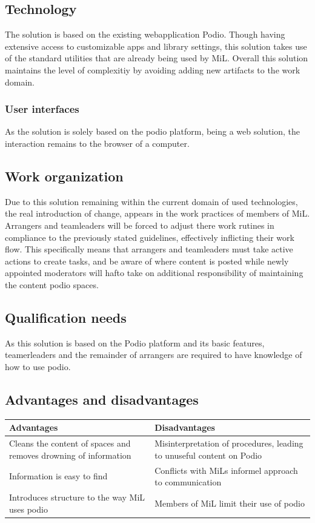 \subsection{Technology}
The solution is based on the existing webapplication Podio. Though having extensive access to customizable apps and library settings, this solution takes use of the standard utilities that are already being used by MiL. Overall this solution maintains the level of complexitiy by avoiding adding new artifacts to the work domain.

\subsubsection{User interfaces}
As the solution is solely based on the podio platform, being a web solution, the interaction remains to the browser of a computer.

\subsection{Work organization}
Due to this solution remaining within the current domain of used technologies, the real introduction of change, appears in the work practices of members of MiL. Arrangers and teamleaders will be forced to adjust there work rutines in compliance to the previously stated guidelines, effectively inflicting their work flow. 
This specifically means that arrangers and teamleaders must take active actions to create tasks, and be aware of where content is posted while newly appointed moderators will hafto take on additional responsibility of maintaining the content podio spaces.

\subsection{Qualification needs}
As this solution is based on the Podio platform and its basic features, teamerleaders and the remainder of arrangers are required to have knowledge of how to use podio.  

\subsection{Advantages and disadvantages}
\begin{center}
    \begin{tabular}{ | p{7cm} | p{7cm} |}
    \hline
    \textbf{Advantages} & \textbf{Disadvantages}  \\ \hline
    Cleans the content of spaces and removes drowning of information & Misinterpretation of procedures, leading to unuseful content on Podio  \\ \hline
    Information is easy to find & Conflicts with MiLs informel approach to communication \\
    \hline
    Introduces structure to the way MiL uses podio & Members of MiL limit their use of podio \\ \hline
    \end{tabular}
\end{center}

